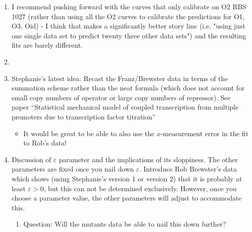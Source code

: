 \begin{enumerate}
	\item I recommend pushing forward with the curves that only calibrate on O2 RBS 1027 (rather than using all the O2 curves to calibrate the predictions for O1, O3, Oid) - I think that makes a significantly better story line (i.e. "using just one single data set to predict twenty three other data sets") and the resulting fits are barely different.
	
	\item {}
	
	
	\item Stephanie's latest idea: Recast the Franz/Brewster data in terms of the
	summation scheme rather than the neat formula (which does not account for small
	copy numbers of operator or large copy numbers of repressor). See paper
	``Statistical mechanical model of coupled transcription from multiple promoters
	due to transcription factor titration'' \begin{itemize} \item It would be great
		to be able to also use the $x$-measurement error in the fit to Rob's data!
	\end{itemize}
	
	\item Discussion of $\varepsilon$ parameter and the implications of its
	sloppiness. The other parameters are fixed once you nail down $\varepsilon$.
	Introduce Rob Brewster's data  which shows (using Stephanie's version 1 or
	version 2) that it is probably at least $\varepsilon > 0$, but this can not be
	determined exclusively. However, once you choose a parameter value, the other
	parameters will adjust to accommodate this. \begin{enumerate} \item Question:
		Will the mutants data be able to nail this down further? \end{enumerate}
	

\end{enumerate}
